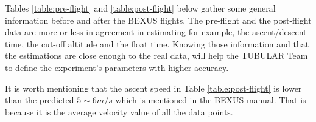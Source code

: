 \documentclass[a4paper,12pt,oneside]{article}
\begin{document}
\begin{appendices}
\smallskip
Tables \ref{table:pre-flight} and \ref{table:post-flight} below gather some general information before and after the BEXUS flights. The pre-flight and the post-flight data are more or less in agreement in estimating for example, the ascent/descent time, the cut-off altitude and the float time. Knowing those information and that the estimations are close enough to the real data, will help the TUBULAR Team to define the experiment's parameters with higher accuracy. 

\smallskip
It is worth mentioning that the ascent speed in Table \ref{table:post-flight} is lower than the predicted $5\sim 6 m/s$ which is mentioned in the BEXUS manual. That is because it is the average velocity value of all the data points.  

\begin{table}[H]

\noindent{}
\caption{Pre-flight Information Available in Previous BEXUS Campaigns.}
\label{table:pre-flight}
\end{table}



\end{appendices}
\end{document}
